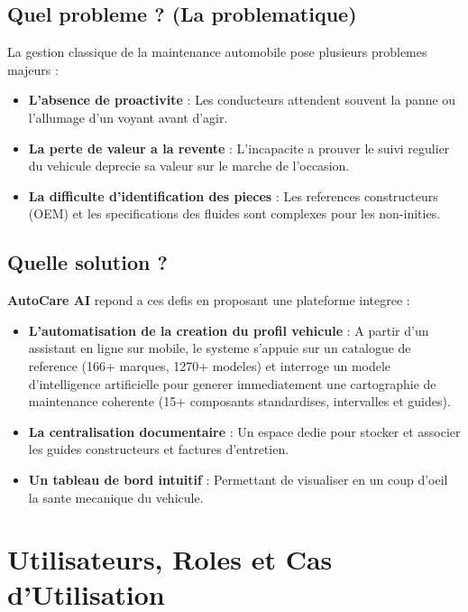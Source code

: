 \documentclass[11pt,a4paper]{report}
\begin{document}
\section{Quel probleme ? (La problematique)}
La gestion classique de la maintenance automobile pose plusieurs problemes majeurs :
\begin{itemize}[label=\textbullet]
    \item \textbf{L'absence de proactivite} : Les conducteurs attendent souvent la panne ou l'allumage d'un voyant avant d'agir.
    \item \textbf{La perte de valeur a la revente} : L'incapacite a prouver le suivi regulier du vehicule deprecie sa valeur sur le marche de l'occasion.
    \item \textbf{La difficulte d'identification des pieces} : Les references constructeurs (OEM) et les specifications des fluides sont complexes pour les non-inities.
\end{itemize}

\section{Quelle solution ?}
\textbf{AutoCare AI} repond a ces defis en proposant une plateforme integree :
\begin{itemize}[label=\textbullet]
    \item \textbf{L'automatisation de la creation du profil vehicule} : A partir d'un assistant en ligne sur mobile, le systeme s'appuie sur un catalogue de reference (166+ marques, 1270+ modeles) et interroge un modele d'intelligence artificielle pour generer immediatement une cartographie de maintenance coherente (15+ composants standardises, intervalles et guides).
    \item \textbf{La centralisation documentaire} : Un espace dedie pour stocker et associer les guides constructeurs et factures d'entretien.
    \item \textbf{Un tableau de bord intuitif} : Permettant de visualiser en un coup d'oeil la sante mecanique du vehicule.
\end{itemize}

\chapter{Utilisateurs, Roles et Cas d'Utilisation}
\end{document}

